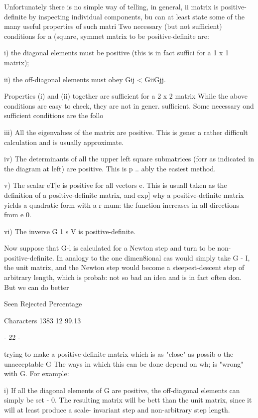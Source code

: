      Unfortunately there is no simple way of telling, in general, ii
matrix is positive-definite by inspecting individual components, bu
can at least state some of the many useful properties of such matri
Two necessary (but not sufficient) conditions for a (square, symmet
matrix to be positive-definite are:
 
  i) the diagonal elements must be positive (this is in fact suffici
     for a 1 x 1 matrix);
 
 ii) the off-diagonal elements must obey Gij < GiiGjj.
 
Properties (i) and (ii) together are sufficient for a 2 x 2 matrix
While the above conditions are easy to check, they are not in gener.
sufficient.  Some necessary ond sufficient conditions are the follo
 
 iii) All the eigenvalues of the matrix are positive.  This is gener
      a rather difficult calculation and is usually approximate.
 
 iv) The determinants of all the upper left square submatrices (forr
                                     as indicated in the diagram at
                                     left) are positive.  This is p
                     ..              ably the easiest method.
 
 
  v) The scalar eT|e is positive for all vectors e.  This is usuall
     taken as the definition of a positive-definite matrix, and exp]
     why a positive-definite matrix yields a quadratic form with a r
     mum:  the function increases in all directions from e  0.
 
 vi) The inverse G 1 s V is positive-definite.
 
     Now suppose that G-l is calculated for a Newton  step and turn
to be non-positive-definite.  In analogy to the one dimen8ional cas
would simply take G - I, the unit matrix, and the Newton step would
become a steepest-descent step of arbitrary length, which is probab:
not so bad an idea and is in fact often don.  But we can do better
 
                 Seen Rejected  Percentage
 
Characters       1383       12   99.13
 
                                - 22 -
 
 
trying to make a positive-definite matrix which is as "close" as possib
o the unacceptable G   The ways in which this can be done depend on wh;
is "wrong" with G.  For example:
 
  i) If all the diagonal elements of G are positive, the off-diagonal
     elements can simply be set - 0.  The resulting matrix will be bett
     than the unit matrix, since it will at least produce a scale-
     invariant step and non-arbitrary step length.
 
